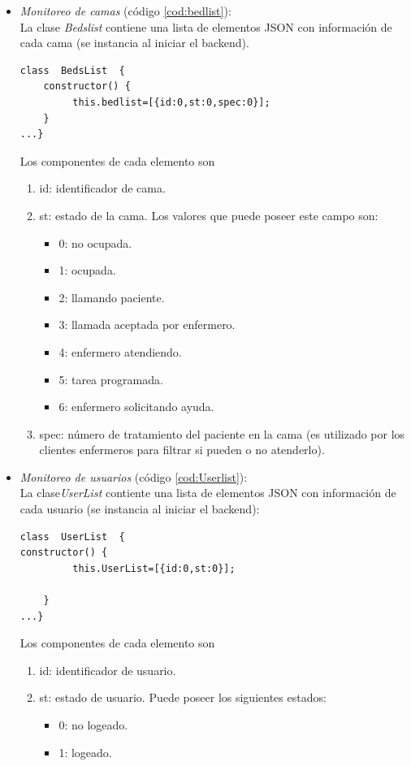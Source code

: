 \begin{itemize}

\item \textit{ Monitoreo de camas} (código \ref{cod:bedlist}):\\
La clase \textit{Bedslist} contiene una lista de elementos JSON con información de cada cama (se instancia al iniciar el backend).

\begin{lstlisting}[label=cod:bedlist,caption=  Clase Bedlist.]
class  BedsList  {    
    constructor() {
         this.bedlist=[{id:0,st:0,spec:0}];                        
    }
...}
\end{lstlisting}

Los componentes de cada elemento son 
\begin{enumerate}
\item id: identificador de cama.
\item st: estado de la cama. Los valores que puede poseer este campo son: 
\begin{itemize}
\item 0: no ocupada.
\item 1: ocupada.
\item 2: llamando paciente.
\item 3: llamada aceptada por enfermero.
\item 4: enfermero atendiendo.
\item 5: tarea programada.
\item 6: enfermero solicitando ayuda.
\end{itemize}
\item spec: número de tratamiento del paciente en la cama (es utilizado por los clientes enfermeros para filtrar si pueden o no atenderlo).
\end{enumerate}


\item \textit{ Monitoreo de usuarios} (código \ref{cod:Userlist}):\\
La clase\textit{UserList} contiente una lista de elementos JSON con información de cada usuario (se instancia al iniciar el backend):

\begin{lstlisting}[label=cod:Userlist,caption=  Clase Userlist.]
class  UserList  {   
constructor() {
         this.UserList=[{id:0,st:0}];                
        
    }
...}
\end{lstlisting}

Los componentes de cada elemento son 
	\begin{enumerate}
		\item id: identificador de usuario.
		\item st: estado de usuario. Puede poseer los siguientes estados: 
			\begin{itemize}
				\item 0: no logeado.
				\item 1: logeado.
			\end{itemize}
	\end{enumerate}





\end{itemize}
